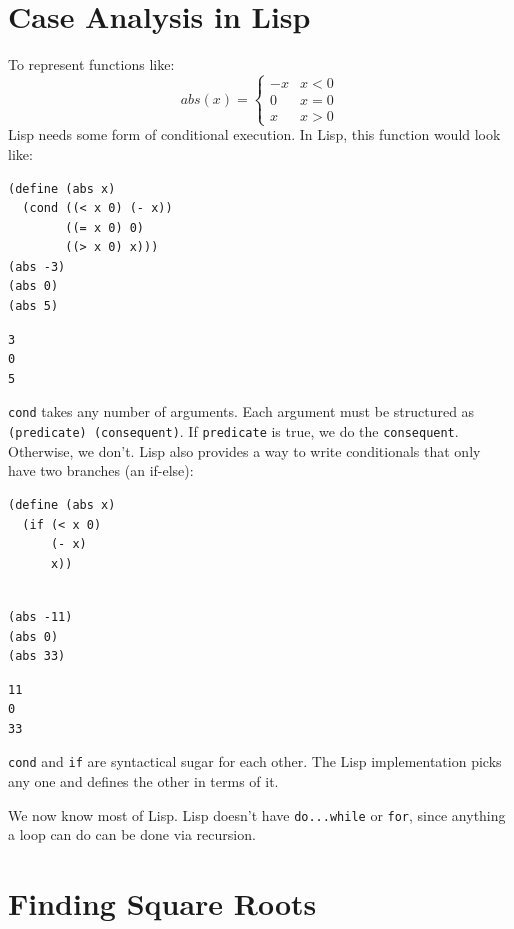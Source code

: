 \documentclass[9pt]{report}
\begin{document}
\section{Case Analysis in Lisp}
\label{sec:org7817428}

To represent functions like:
$$abs(x) = \begin{cases}
   -x & x<0\\
   0 & x = 0\\
   x & x > 0
   \end{cases}$$
Lisp needs some form of conditional execution. In Lisp, this
function would look like:

\begin{verbatim}
(define (abs x)
  (cond ((< x 0) (- x))
        ((= x 0) 0)
        ((> x 0) x)))
(abs -3)
(abs 0)
(abs 5)
\end{verbatim}

\begin{verbatim}
3
0
5
\end{verbatim}


\texttt{cond} takes any number of arguments. Each argument must be
structured as \texttt{(predicate) (consequent)}. If \texttt{predicate} is true,
we do the \texttt{consequent}. Otherwise, we don't. Lisp also provides a
way to write conditionals that only have two branches (an if-else):

\begin{verbatim}
(define (abs x)
  (if (< x 0)
      (- x)
      x))
\end{verbatim}

\begin{verbatim}

(abs -11)
(abs 0)
(abs 33)
\end{verbatim}

\begin{verbatim}
11
0
33
\end{verbatim}


\texttt{cond} and \texttt{if} are syntactical sugar for each other. The Lisp
implementation picks any one and defines the other in terms of it.

We now know most of Lisp. Lisp doesn't have \texttt{do...while} or \texttt{for},
since anything a loop can do can be done via recursion.

\section{Finding Square Roots}
\label{sec:orgd3e29fa}
\end{document}
